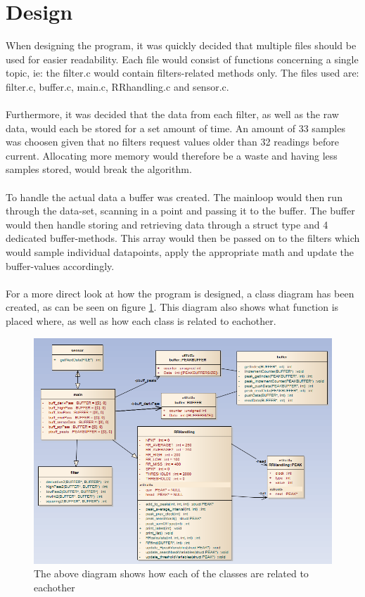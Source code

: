 \documentclass[12pt,a4paper]{article}
\begin{document}
\section{Design}
	When designing the program, it was quickly decided that multiple files should be used for easier readability. Each file would consist of functions concerning a single topic, ie: the filter.c would contain filters-related methods only. The files used are: filter.c, buffer.c, main.c, RRhandling.c and sensor.c.\\
	\\
	Furthermore, it was decided that the data from each filter, as well as the raw data, would each be stored for a set amount of time. An amount of 33 samples was choosen given that no filters request values older than 32 readings before current. Allocating more memory would therefore be a waste and having less samples stored, would break the algorithm.\\
	\\
	To handle the actual data a buffer was created. The mainloop would then run through the data-set, scanning in a point and passing it to the buffer. The buffer would then handle storing and retrieving data through a struct type and 4 dedicated buffer-methods. This array would then be passed on to the filters which would sample individual datapoints, apply the appropriate math and update the buffer-values accordingly.\\
	\\
	For a more direct look at how the program is designed, a class diagram has been created, as can be seen on figure \ref{class_diagram}. This diagram also shows what function is placed where, as well as how each class is related to eachother.
	\begin{figure}[h!]
		\centering
			\includegraphics[width=1\textwidth]{Screenshots/class_diagram.png}
		\caption{The above diagram shows how each of the classes are related to eachother}
		\label{class_diagram}
	\end{figure}
\end{document}
